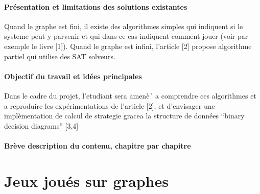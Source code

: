 \documentclass[12pt,a4paper,oneside, titlepage]{report}
\begin{document}
\subsubsection*{Présentation et limitations des solutions existantes}
Quand le
graphe est fini, il existe des algorithmes simples qui indiquent si le systeme peut y parvenir et qui dans ce cas
indiquent comment jouer (voir par exemple le livre [1]). Quand le graphe est infini, l’article [2] propose 
algorithme partiel qui utilise des SAT solveurs.
\subsubsection*{Objectif du travail et idées principales}
Dans le cadre du projet, l’etudiant sera amenè´ a comprendre
ces algorithmes et a reproduire les expérimentations de l’article [2], et d’envisager une implèmentation de
calcul de strategie gracea la structure de données “binary decision diagrams” [3,4]
\subsubsection*{Brève description du contenu, chapitre par chapitre}
\newpage


\chapter{Jeux joués sur graphes}\label{ch:1}
\renewcommand{\leftmark}{CHAPITRE \thechapter.~~Jeux joués sur graphes}
\end{document}
